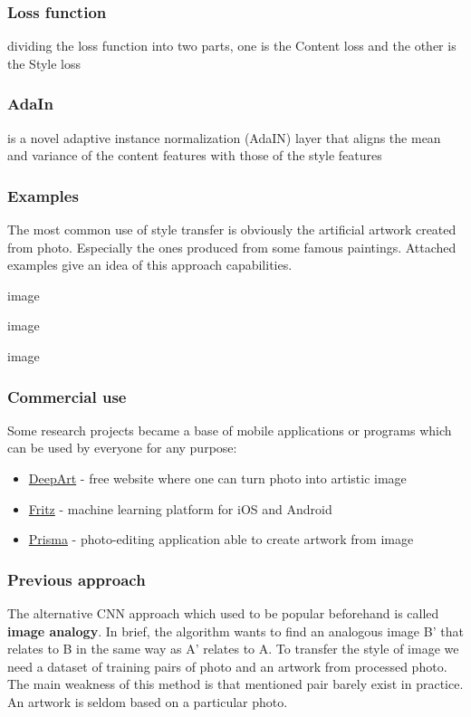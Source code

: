 \documentclass[../Main.tex]{subfiles}
\begin{document}
    \subsubsection{Loss function}
    
    dividing the loss function into two parts, one is the Content loss and the other is the Style loss
    
    \subsubsection{AdaIn}
    
    
    is \cite{huang2017adain} a novel adaptive instance normalization (AdaIN) layer that aligns the mean and variance of the content features with those of the style features
    
    \subsubsection{Examples}
    The most common use of style transfer is obviously the artificial artwork created from photo. Especially the ones produced from some famous paintings. Attached examples give an idea of this approach capabilities. 
    
    image
    
    image
    
    image
    
    \subsubsection{Commercial use}
    Some research projects became a base of mobile applications or programs which can be used by everyone for any purpose:
    \begin{itemize}
        \item \href{https://deepart.io}{DeepArt} - free website where one can turn photo into artistic image
        \item \href{https://www.fritz.ai}{Fritz} - machine learning platform for iOS and Android 
        \item \href{https://prisma-ai.com}{Prisma} - photo-editing application able to create artwork from image
    \end{itemize}
    
    \subsubsection{Previous approach}
    The alternative CNN approach which used to be popular beforehand is called \textbf{image analogy}. In brief, the algorithm wants to find an analogous image B' that relates to B in the same way as A' relates to A.  To transfer the style of image we need a dataset of training pairs of photo and an artwork from processed photo. The main weakness of this method is that mentioned pair barely exist in practice. An artwork is seldom based on a particular photo.
    
\end{document}
